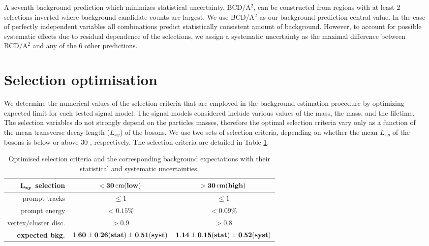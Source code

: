 A seventh background prediction which minimizes statistical uncertainty, BCD/A$^2$, can be constructed from regions
with at least 2 selections inverted where background candidate counts are largest. 
We use BCD/A$^2$ as our background prediction central value. In the case of perfectly independent 
variables all combinations predict statistically consistent  amount of background. 
However, to account for possible systematic
effects due to residual dependence of the selections, we assign a systematic uncertainty as the maximal difference 
between BCD/A$^2$ and any of the 6 other predictions.

\section{Selection optimisation}
\label{sec:cutvalues}
We determine the numerical values of the selection criteria that are employed in the background estimation procedure 
by optimizing expected limit for each tested signal model.
The signal models considered include various values of the \Higgs mass, the \X mass, and the \X lifetime.
The selection variables
do not strongly depend on the particles masses, therefore the optimal selection criteria
vary only as a function of the
mean transverse decay length ($L_{xy}$)
of the \X bosons. We use two sets of selection criteria,
depending on whether the mean
$L_{xy}$ of the \X bosons is below or above 30 \cm, respectively. The selection criteria are
detailed in Table \ref{tab:background}.

\begin{table}[htbp]
\centering
\begin{tabular}{r|c|c}
$\bf L_{xy}$ \bf selection &\bf  $\bf <30\,\text{cm} (low)$ & \bf  $\bf >30\,\text{cm} (high)$ \\
\hline
prompt tracks & $\leq1$ & $\leq1$ \\
prompt energy & $<0.15\%$ & $<0.09\%$ \\
vertex/cluster disc. & $>0.9$ & $>0.8$  \\
\hline
\bf expected bkg. & $\bf 1.60\pm0.26(stat)\pm0.51(syst)$ & $\bf 1.14\pm0.15(stat)\pm0.52(syst)$ \\
\end{tabular}
\caption{Optimised selection criteria and the corresponding background expectations with their statistical and systematic uncertainties.\label{tab:background}}
\end{table}

